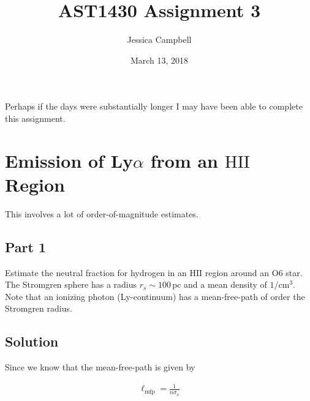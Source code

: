 \documentclass[12pt]{article}
\begin{document}
 
 
\title{AST1430 Assignment 3}
\author{Jessica Campbell}
\date{March 13, 2018}
\maketitle

Perhaps if the days were substantially longer I may have been able to complete this assignment.


\section{Emission of Ly$\alpha$ from an $\mathrm{HII}$ Region}

This involves a lot of order-of-magnitude estimates.


\subsection*{Part 1}

Estimate the neutral fraction for hydrogen in an $\mathrm{HII}$ region around an O6 star. The Stromgren sphere has a radius $r_s \sim 100\,\mathrm{pc}$ and a mean density of $1/\mathrm{cm^3}$. Note that an ionizing photon (Ly-continuum) has a mean-free-path of order the Stromgren radius.


\subsection*{Solution}

Since we know that the mean-free-path is given by

\begin{align*}
\ell_\mathrm{mfp} = \frac{1}{n\sigma_\nu}
\end{align*}
\end{document}
